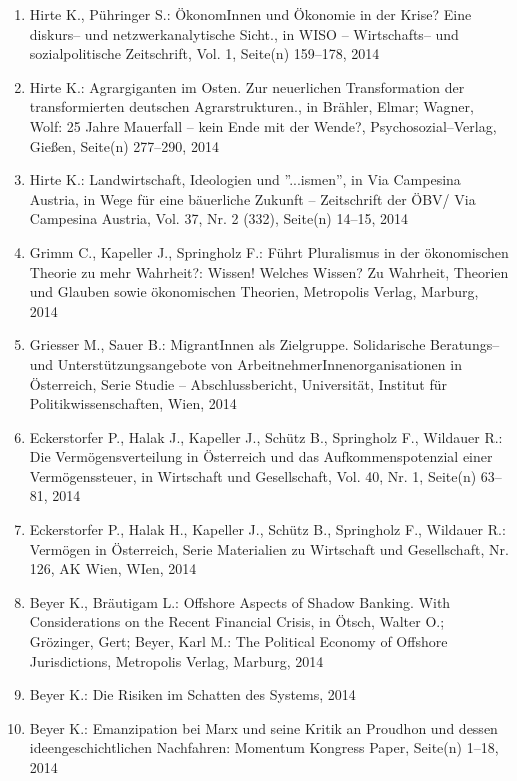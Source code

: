 \begin{enumerate}
	 \item Hirte K., Pühringer S.: ÖkonomInnen und Ökonomie in der Krise? Eine diskurs-- und netzwerkanalytische Sicht., in WISO -- Wirtschafts-- und sozialpolitische Zeitschrift, Vol. 1, Seite(n) 159--178, 2014
	 \item Hirte K.: Agrargiganten im Osten. Zur neuerlichen Transformation der transformierten deutschen Agrarstrukturen., in Brähler, Elmar; Wagner, Wolf: 25 Jahre Mauerfall – kein Ende mit der Wende?, Psychosozial--Verlag, Gießen, Seite(n) 277--­290, 2014
	 \item Hirte K.: Landwirtschaft, Ideologien und ''...ismen'', in Via Campesina Austria, in Wege für eine bäuerliche Zukunft – Zeitschrift der ÖBV/ Via Campesina Austria, Vol. 37, Nr. 2 (332), Seite(n) 14--15, 2014
	 \item Grimm C., Kapeller J., Springholz F.: Führt Pluralismus in der ökonomischen Theorie zu mehr Wahrheit?: Wissen! Welches Wissen? Zu Wahrheit, Theorien und Glauben sowie ökonomischen Theorien, Metropolis Verlag, Marburg, 2014
	 \item Griesser M., Sauer B.: MigrantInnen als Zielgruppe. Solidarische Beratungs-- und Unterstützungsangebote von ArbeitnehmerInnenorganisationen in Österreich, Serie Studie -- Abschlussbericht, Universität, Institut für Politikwissenschaften, Wien, 2014
	 \item Eckerstorfer P., Halak J., Kapeller J., Schütz B., Springholz F., Wildauer R.: Die Vermögensverteilung in Österreich und das Aufkommenspotenzial einer Vermögenssteuer, in Wirtschaft und Gesellschaft, Vol. 40, Nr. 1, Seite(n) 63--81, 2014
	 \item Eckerstorfer P., Halak H., Kapeller J., Schütz B., Springholz F., Wildauer R.: Vermögen in Österreich, Serie Materialien zu Wirtschaft und Gesellschaft, Nr. 126, AK Wien, WIen, 2014
	 \item Beyer K., Bräutigam L.: Offshore Aspects of Shadow Banking. With Considerations on the Recent Financial Crisis, in Ötsch, Walter O.; Grözinger, Gert; Beyer, Karl M.: The Political Economy of Offshore Jurisdictions, Metropolis Verlag, Marburg, 2014
	 \item Beyer K.: Die Risiken im Schatten des Systems, 2014
	 \item Beyer K.: Emanzipation bei Marx und seine Kritik an Proudhon und dessen ideengeschichtlichen Nachfahren: Momentum Kongress Paper, Seite(n) 1--18, 2014
\end{enumerate}
